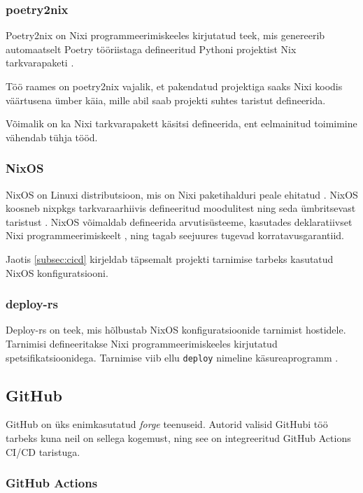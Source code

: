 \subsubsection{poetry2nix}

Poetry2nix on Nixi programmeerimiskeeles kirjutatud teek, mis genereerib automaatselt Poetry tööriistaga defineeritud Pythoni projektist Nix tarkvarapaketi \cite{poetry2nix-repo}.

Töö raames on poetry2nix vajalik, et pakendatud projektiga saaks Nixi koodis väärtusena ümber käia, mille abil saab projekti suhtes taristut defineerida.

Võimalik on ka Nixi tarkvarapakett käsitsi defineerida, ent eelmainitud toimimine vähendab tühja tööd.

\subsubsection{NixOS}

NixOS on Linuxi distributsioon, mis on Nixi paketihalduri peale ehitatud \cite{nixos-manual-preface}. NixOS koosneb nixpkgs tarkvaraarhiivis defineeritud moodulitest ning seda ümbritsevast taristust \cite{nixos-manual-preface}. NixOS võimaldab defineerida arvutisüsteeme, kasutades deklaratiivset Nixi programmeerimiskeelt \cite{nixos-manual-configuration}, ning tagab seejuures tugevad korratavusgarantiid.

Jaotis \ref{subsec:cicd} kirjeldab täpsemalt projekti tarnimise tarbeks kasutatud NixOS konfiguratsiooni.

\subsubsection{deploy-rs}

Deploy-rs on teek, mis hõlbustab NixOS konfiguratsioonide tarnimist hostidele. Tarnimisi defineeritakse Nixi programmeerimiskeeles kirjutatud spetsifikatsioonidega. Tarnimise viib ellu \texttt{deploy} nimeline käsureaprogramm \cite{deploy-rs}.

\subsection{GitHub}

GitHub on üks enimkasutatud \emph{forge} teenuseid. Autorid valisid GitHubi töö tarbeks kuna neil on sellega kogemust, ning see on integreeritud GitHub Actions CI/CD taristuga.

\subsubsection{GitHub Actions}\label{subsubsec:github-actions}

